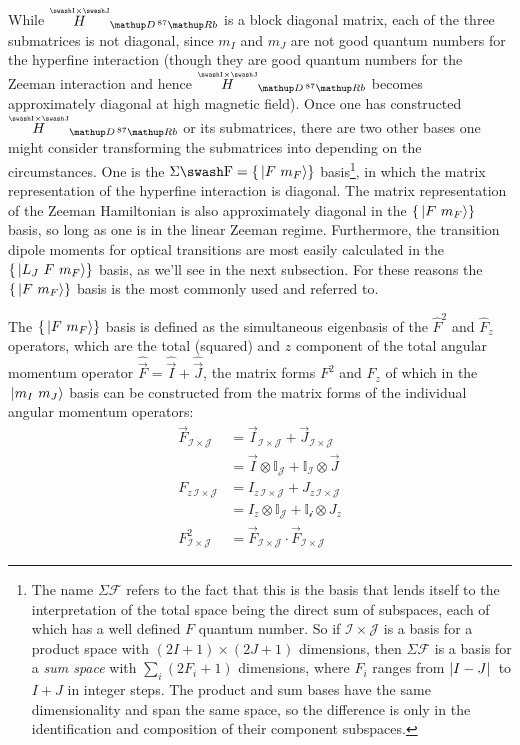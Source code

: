 While $\oversetIJ H_{\up{D}\,^{87}\up{Rb}}$ is a block diagonal matrix, each of the three submatrices is not diagonal, since $m_I$ and $m_J$ are not good quantum numbers for the hyperfine interaction (though they are good quantum numbers for the Zeeman interaction and hence $\oversetIJ  H_{\up{D}\,^{87}\up{Rb}}$ becomes approximately diagonal at high magnetic field). Once one has constructed $\oversetIJ  H_{\up{D}\,^{87}\up{Rb}}$ or its submatrices, there are two other bases one might consider transforming the submatrices into depending on the circumstances. One is the $\Sigma\mathcal{F} = \{\ket{F\ m_F}\}$ basis\footnote{The name $\Sigma\mathcal{F}$ refers to the fact that this is the basis that lends itself to the interpretation of the total space being the direct sum of subspaces, each of which has a well defined $F$ quantum number. So if $\mathcal{I}\times\mathcal{J}$ is a basis for a product space with $(2I+1)\times(2J+1)$ dimensions, then $\Sigma \mathcal{F}$ is a basis for a \emph{sum space} with $\sum_i (2F_i + 1)$ dimensions, where $F_i$ ranges from $\abs{I-J}$ to $I+J$ in integer steps. The product and sum bases have the same dimensionality and span the same space, so the difference is only in the identification and composition of their component subspaces.}, in which the matrix representation of the hyperfine interaction is diagonal. The matrix representation of the Zeeman Hamiltonian is also approximately diagonal in the $\{\ket{F\ m_F}\}$ basis, so long as one is in the linear Zeeman regime. Furthermore, the transition dipole moments for optical transitions are most easily calculated in the $\{\ket{L_J\ F\ m_F}\}$ basis, as we'll see in the next subsection. For these reasons the $\{\ket{F\ m_F}\}$ basis is the most commonly used and referred to.

The $\{\ket{F\ m_F}\}$ basis is defined as the simultaneous eigenbasis of the $\hat F^2$ and $\hat F_z$ operators, which are the total (squared) and $z$ component of the total angular momentum operator $\hat{\vec{F}} = \hat{\vec{I}} + \hat{\vec{J}}$, the matrix forms $F^2$ and $F_z$ of which in the $\ket{m_I\ m_J}$ basis can be constructed from the matrix forms of the individual angular momentum operators:
\begin{align}
\vec F_{\mathcal{I}\times\mathcal{J}} &= \vec I_{\mathcal{I}\times\mathcal{J}} + \vec J_{\mathcal{I}\times\mathcal{J}}\nonumber\\
& = \vec I \otimes \mathbb{I}_{\mathcal{J}} + \mathbb{I}_{\mathcal{I}} \otimes \vec J\\
F_{z\,\mathcal{I}\times\mathcal{J}} &= I_{z\,\mathcal{I}\times\mathcal{J}} + J_{z\,\mathcal{I}\times\mathcal{J}}\nonumber\\
& = I_z \otimes \mathbb{I}_{\mathcal{J}} + \mathbb{I}_{\mathcal{i}} \otimes J_z\\
F^2_{\mathcal{I}\times\mathcal{J}} &= \vec F_{\mathcal{I}\times\mathcal{J}}\cdot\vec F_{\mathcal{I}\times\mathcal{J}}
\end{align}

